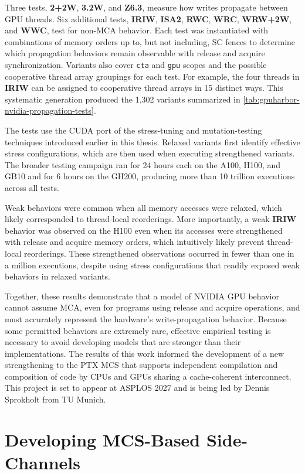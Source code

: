 Three tests, \textbf{2+2W}, \textbf{3.2W}, and \textbf{Z6.3}, measure how writes propagate between GPU threads. Six additional tests, \textbf{IRIW}, \textbf{ISA2}, \textbf{RWC}, \textbf{WRC}, \textbf{WRW+2W}, and \textbf{WWC}, test for non-MCA behavior. Each test was instantiated with combinations of memory orders up to, but not including, SC fences to determine which propagation behaviors remain observable with release and acquire synchronization. Variants also cover \texttt{cta} and \texttt{gpu} scopes and the possible cooperative thread array groupings for each test. For example, the four threads in \textbf{IRIW} can be assigned to cooperative thread arrays in 15 distinct ways. This systematic generation produced the 1,302 variants summarized in \mytab\ref{tab:gpuharbor-nvidia-propagation-tests}.

The tests use the CUDA port of the stress-tuning and mutation-testing techniques introduced earlier in this thesis. Relaxed variants first identify effective stress configurations, which are then used when executing strengthened variants. The broader testing campaign ran for 24 hours each on the A100, H100, and GB10 and for 6 hours on the GH200, producing more than 10 trillion executions across all tests.

Weak behaviors were common when all memory accesses were relaxed, which likely corresponded to thread-local reorderings. More importantly, a weak \textbf{IRIW} behavior was observed on the H100 even when its accesses were strengthened with release and acquire memory orders, which intuitively likely prevent thread-local reorderings. These strengthened observations occurred in fewer than one in a million executions, despite using stress configurations that readily exposed weak behaviors in relaxed variants.

Together, these results demonstrate that a model of NVIDIA GPU behavior cannot assume MCA, even for programs using release and acquire operations, and must accurately represent the hardware's write-propagation behavior. Because some permitted behaviors are extremely rare, effective empirical testing is necessary to avoid developing models that are stronger than their implementations. The results of this work informed the development of a new strengthening to the PTX MCS that supports independent compilation and composition of code by CPUs and GPUs sharing a cache-coherent interconnect. This project is set to appear at ASPLOS 2027 and is being led by Dennis Sprokholt from TU Munich.

\section{Developing MCS-Based Side-Channels \label{sec:gpuharbor-sidechannel}}


